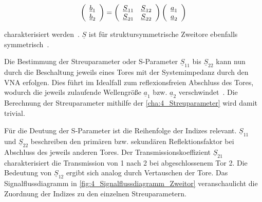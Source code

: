 \begin{equation}
\centering
    \left(\begin{array}{c}\underline{b}_1 \\ \underline{b}_2 \end{array}\right) = \left(\begin{array}{cc}\underline{S}_{11} & \underline{S}_{12} \\ \underline{S}_{21} & \underline{S}_{22} \end{array}\right) \left(\begin{array}{c}\underline{a}_{1} \\ \underline{a}_{2} \end{array}\right) \label{cha:4_Streuparameter}
\end{equation}

charakterisiert werden~\cite{Taschenbuch_HF-Technik}. $\underline{S}$ ist für struktursymmetrische Zweitore ebenfalls symmetrisch~\cite{Grundkurs_Hochfrequenztechnik}.  
\par
\vspace{\linespace}
Die Bestimmung der Streuparameter oder S-Parameter $\underline{S}_{11}$ bis $\underline{S}_{22}$ kann nun durch die Beschaltung jeweils eines Tores mit der Systemimpedanz durch den VNA erfolgen. Dies führt im Idealfall zum reflexionsfreien Abschluss des Tores, wodurch die jeweils zulaufende Wellengröße $\underline{a}_1$ bzw. $\underline{a}_2$ verschwindet~\cite{Grundkurs_Hochfrequenztechnik}. Die Berechnung der Streuparameter mithilfe der \Gleichung\eqref{cha:4_Streuparameter} wird damit trivial. 
\par
\vspace{\linespace}
Für die Deutung der S-Parameter ist die Reihenfolge der Indizes relevant. $\underline{S}_{11}$ und $\underline{S}_{22}$ beschreiben den primären bzw. sekundären Reflektionsfaktor bei Abschluss des jeweils anderen Tores. Der Transmissionskoeffizient $\underline{S}_{21}$ charakterisiert die Transmission von 1 nach 2 bei abgeschlossenem Tor 2. Die Bedeutung von $\underline{S}_{12}$ ergibt sich analog durch Vertauschen der Tore. Das Signalflussdiagramm in \Abb\ref{fig:4_Signalflussdiagramm_Zweitor} veranschaulicht die Zuordnung der Indizes zu den einzelnen Streuparametern.
\par
\vspace{\linespace}

